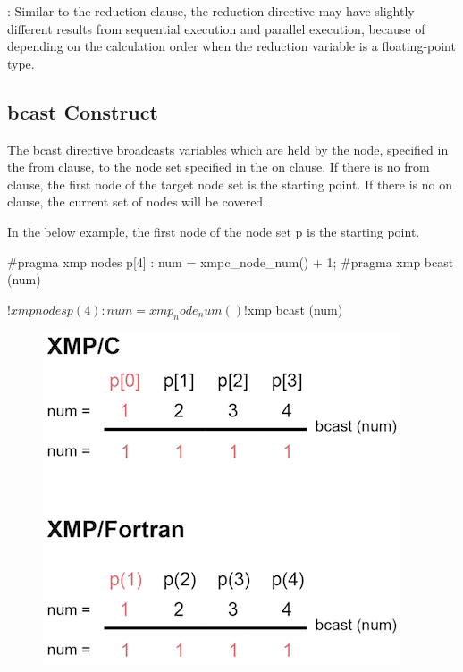 \noindent\hrulefill

: Similar to the reduction clause, the reduction
directive may have
slightly different results from sequential execution and parallel
execution, because of depending on the calculation order when the
reduction variable is a floating-point type.

\noindent\hrulefill


\subsection{{\bf bcast} Construct}

The bcast directive broadcasts variables which are held by the node,
specified in the from clause, to the node set specified in the on
clause. If there is no from clause, the first node of the target node
set is the starting point. If there is no on clause, the current set of
nodes will be covered.

In the below example, the first node of the node set p is the starting point.

\begin{XCexample}
#pragma xmp nodes p[4]
  :
num = xmpc_node_num() + 1;
#pragma xmp bcast (num)
\end{XCexample}

\begin{XFexample}
!$xmp nodes p(4)
  :
num = xmp_node_num()
!$xmp bcast (num)
\end{XFexample}

\begin{figure}
  \centering
  \includegraphics{figs/bcast.png}
\end{figure}

